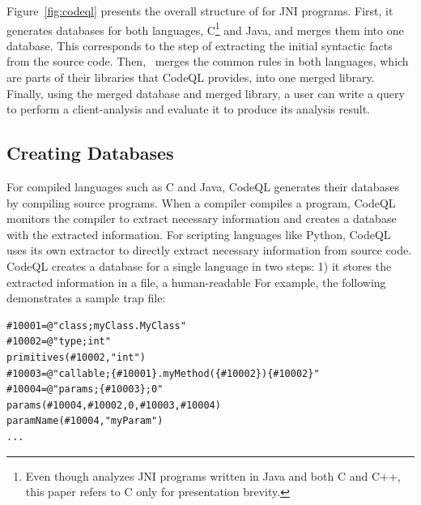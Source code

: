 
Figure~\ref{fig:codeql} presents the overall structure of \ours for JNI
programs.  First, it generates databases for both languages, C\footnote{ Even
though \ours analyzes JNI programs written in Java and both C and C++, this
paper refers to C only for presentation brevity.} and Java, and merges them into
one database.  This corresponds to the step of extracting the initial syntactic
facts from the source code.  Then, \ours~merges the common rules in both
languages, which are parts of their libraries that CodeQL provides, into one
merged library.  Finally, using the merged database and merged library, a user
can write a query to perform a client-analysis and evaluate it to produce its
analysis result.

\subsection{Creating Databases}
For compiled languages such as C and Java, CodeQL generates their databases by
compiling source programs.  When a compiler compiles a program, CodeQL monitors
the compiler to extract necessary information and creates a database with the
extracted information. For scripting languages like Python, CodeQL uses its own
extractor to directly extract necessary information from source code.
CodeQL creates a database for a single language in two steps:
1) it stores the extracted information in a  file,
a human-readable 
For example, the following demonstrates a sample trap file:

\begin{lstlisting}[style=java,numbers=none]
#10001=@"class;myClass.MyClass"
#10002=@"type;int"
primitives(#10002,"int")
#10003=@"callable;{#10001}.myMethod({#10002}){#10002}"
#10004=@"params;{#10003};0"
params(#10004,#10002,0,#10003,#10004)
paramName(#10004,"myParam")
...
\end{lstlisting}

